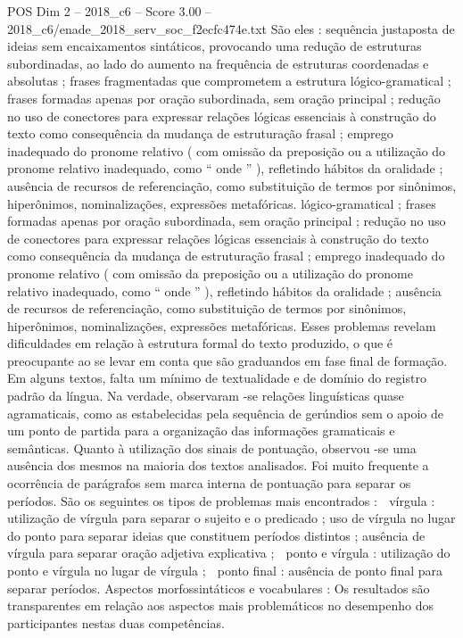 \begin{textsample}{POS Dim 2 – 2018\_c6 – Score 3.00 – 2018\_c6/enade\_2018\_serv\_soc\_f2ecfc474e.txt}
São eles : sequência justaposta de ideias sem encaixamentos sintáticos, provocando uma redução de estruturas subordinadas, ao lado do aumento na frequência de estruturas coordenadas e absolutas ; frases fragmentadas que comprometem a estrutura lógico-gramatical ; frases formadas apenas por oração subordinada, sem oração principal ; redução no uso de conectores para expressar relações lógicas essenciais à construção do texto como consequência da mudança de estruturação frasal ; emprego inadequado do pronome relativo ( com omissão da preposição ou a utilização do pronome relativo inadequado, como “ onde ” ), refletindo hábitos da oralidade ; ausência de recursos de referenciação, como substituição de termos por sinônimos, hiperônimos, nominalizações, expressões metafóricas. lógico-gramatical ; frases formadas apenas por oração subordinada, sem oração principal ; redução no uso de conectores para expressar relações lógicas essenciais à construção do texto como consequência da mudança de estruturação frasal ; emprego inadequado do pronome relativo ( com omissão da preposição ou a utilização do pronome relativo inadequado, como “ onde ” ), refletindo hábitos da oralidade ; ausência de recursos de referenciação, como substituição de termos por sinônimos, hiperônimos, nominalizações, expressões metafóricas.
Esses problemas revelam dificuldades em relação à estrutura formal do texto produzido, o que é preocupante ao se levar em conta que são graduandos em fase final de formação.
Em alguns textos, falta um mínimo de textualidade e de domínio do registro padrão da língua.
Na verdade, observaram -se relações linguísticas quase agramaticais, como as estabelecidas pela sequência de gerúndios sem o apoio de um ponto de partida para a organização das informações gramaticais e semânticas.
Quanto à utilização dos sinais de pontuação, observou -se uma ausência dos mesmos na maioria dos textos analisados.
Foi muito frequente a ocorrência de parágrafos sem marca interna de pontuação para separar os períodos.
São os seguintes os tipos de problemas mais encontrados :  vírgula : utilização de vírgula para separar o sujeito e o predicado ; uso de vírgula no lugar do ponto para separar ideias que constituem períodos distintos ; ausência de vírgula para separar oração adjetiva explicativa ;  ponto e vírgula : utilização do ponto e vírgula no lugar de vírgula ;  ponto final : ausência de ponto final para separar períodos.
Aspectos morfossintáticos e vocabulares : Os resultados são transparentes em relação aos aspectos mais problemáticos no desempenho dos participantes nestas duas competências.

\end{textsample}
